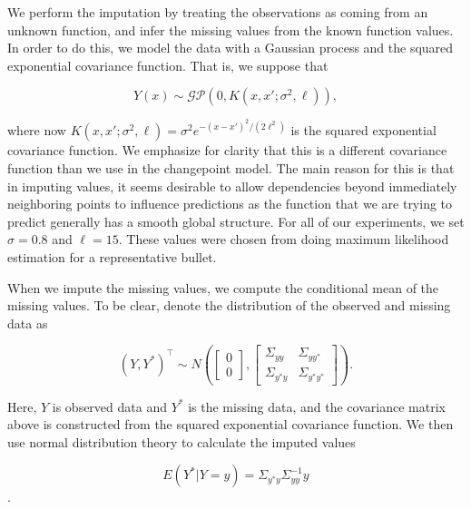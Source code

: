 \documentclass[12pt]{article}
\begin{document}
We perform the imputation by treating the observations as coming from an
unknown function, and infer the missing values from the known function
values. In order to do this, we model the data with a Gaussian process
and the squared exponential covariance function. That is, we suppose
that

\[
Y(x) \sim \mathcal{GP}(0, K(x,x';\sigma^2, \ell)),
\]

\noindent where now
\(K(x,x';\sigma^2, \ell) = \sigma^2 e^{-(x - x')^2/(2\ell^2)}\) is the
squared exponential covariance function. We emphasize for clarity that
this is a different covariance function than we use in the changepoint
model. The main reason for this is that in imputing values, it seems
desirable to allow dependencies beyond immediately neighboring points to
influence predictions as the function that we are trying to predict
generally has a smooth global structure. For all of our experiments, we
set \(\sigma = 0.8\) and \(\ell = 15\). These values were chosen from
doing maximum likelihood estimation for a representative bullet.

When we impute the missing values, we compute the conditional mean of
the missing values. To be clear, denote the distribution of the observed
and missing data as

\[ 
(Y,Y^*)^\top \sim N\left( \begin{bmatrix} 0 \\ 0 \end{bmatrix}, \begin{bmatrix} \Sigma_{yy} & \Sigma_{yy^*} \\ \Sigma_{y^*y} & \Sigma_{y^*y^*}\end{bmatrix} \right).
\]

\noindent Here, \(Y\) is observed data and \(Y^*\) is the missing data,
and the covariance matrix above is constructed from the squared
exponential covariance function. We then use normal distribution theory
to calculate the imputed values

\[ E(Y^*|Y = y) = \Sigma_{y^*y} \Sigma_{yy}^{-1}y \].



\end{document}
